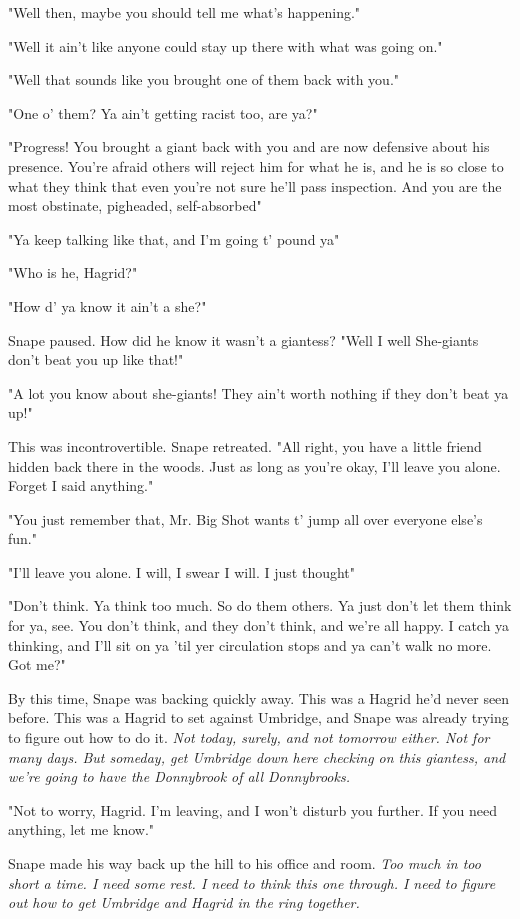 "Well then, maybe you should tell me what's happening."

"Well it ain't like anyone could stay up there with what was going on."

"Well that sounds like you brought one of them back with you."

"One o' them? Ya ain't getting racist too, are ya?"

"Progress! You brought a giant back with you and are now defensive about his presence. You're afraid others will reject him for what he is, and he is so close to what they think that even you're not sure he'll pass inspection. And you are the most obstinate, pigheaded, self-absorbed{\el}"

"Ya keep talking like that, and I'm going t' pound ya{\el}"

"Who is he, Hagrid?"

"How d' ya know it ain't a she?"

Snape paused. How did he know it wasn't a giantess? "Well{\el} I{\el} well{\el} She-giants don't beat you up like that!"

"A lot you know about she-giants! They ain't worth nothing if they don't beat ya up!"

This was incontrovertible. Snape retreated. "All right, you have a little friend hidden back there in the woods. Just as long as you're okay, I'll leave you alone. Forget I said anything."

"You just remember that, Mr. Big Shot wants t' jump all over everyone else's fun."

"I'll leave you alone. I will, I swear I will. I just thought{\el}"

"Don't think. Ya think too much. So do them others. Ya just don't let them think for ya, see. You don't think, and they don't think, and we're all happy. I catch ya thinking, and I'll sit on ya 'til yer circulation stops and ya can't walk no more. Got me?"

By this time, Snape was backing quickly away. This was a Hagrid he'd never seen before. This was a Hagrid to set against Umbridge, and Snape was already trying to figure out how to do it. \emph{Not today, surely, and not tomorrow either. Not for many days. But someday, get Umbridge down here checking on this giant{\el}ess, and we're going to have the Donnybrook of all Donnybrooks.}

"Not to worry, Hagrid. I'm leaving, and I won't disturb you further. If you need anything, let me know."

Snape made his way back up the hill to his office and room. \emph{Too much in too short a time. I need some rest. I need to think this one through. I need to figure out how to get Umbridge and Hagrid in the ring together.}

